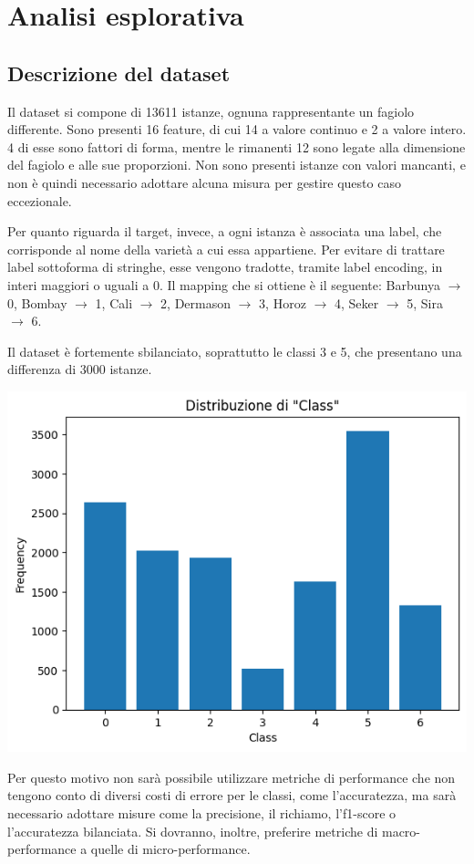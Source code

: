 \section{Analisi esplorativa}
\subsection{Descrizione del dataset}
Il dataset \cite{dry_bean_dataset} si compone di 13611 istanze, ognuna rappresentante un fagiolo
differente.
Sono presenti 16 feature, di cui 14 a valore continuo e 2 a valore intero.
4 di esse sono fattori di forma, mentre
le rimanenti 12 sono legate alla dimensione del fagiolo e alle
sue proporzioni.
Non sono presenti istanze con valori mancanti, e non è quindi necessario
adottare alcuna misura per gestire questo caso eccezionale.

Per quanto riguarda il target, invece, a ogni istanza è associata una label,
che corrisponde al nome della varietà a cui
essa appartiene. Per evitare di trattare label sottoforma di stringhe,
esse vengono tradotte, tramite label encoding, in interi maggiori o uguali a 0.
Il mapping che si ottiene è il seguente: Barbunya $\rightarrow$ 0, 
Bombay $\rightarrow$ 1, Cali $\rightarrow$ 2, Dermason $\rightarrow$ 3,
Horoz $\rightarrow$ 4, Seker $\rightarrow$ 5, Sira $\rightarrow$ 6.

Il dataset è fortemente sbilanciato, soprattutto le classi 3 e 5, che
presentano una differenza di 3000 istanze. 
\begin{Figure}
    \centering
    \includegraphics[width=\linewidth]{img/unbalanced_dataset.png}
\end{Figure}
Per questo motivo non sarà possibile
utilizzare metriche di performance che non tengono conto di diversi costi
di errore per le classi, come l'accuratezza, ma sarà necessario adottare misure
come la precisione, il richiamo, l'f1-score o l'accuratezza bilanciata.
Si dovranno, inoltre, preferire metriche di macro-performance a quelle di 
micro-performance.

